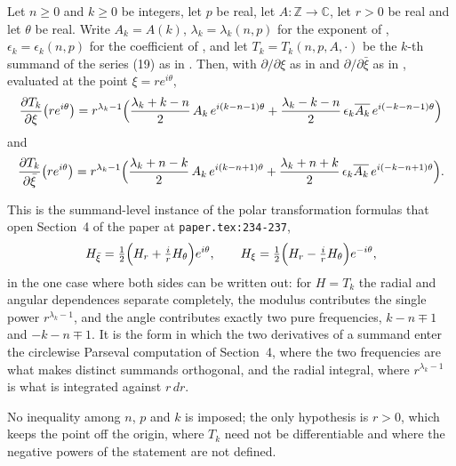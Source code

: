 \begin{helper}
Let $n\ge0$ and $k\ge0$ be integers, let $p$ be real, let
$A\colon\mathbb{Z}\to\mathbb{C}$, let $r>0$ be real and let $\theta$ be real.
Write $A_k=A(k)$, $\lambda_k=\lambda_k(n,p)$ for the exponent of
, $\epsilon_k=\epsilon_k(n,p)$ for the coefficient of
, and let $T_k=T_k(n,p,A,\cdot)$ be the $k$-th summand of the
series (19) as in .  Then, with $\partial/\partial\xi$ as in
 and $\partial/\partial\bar\xi$ as in , evaluated at
the point $\xi=re^{i\theta}$,
\[
  \frac{\partial T_k}{\partial\xi}\bigl(re^{i\theta}\bigr)
  =r^{\lambda_k-1}\Bigl(
      \frac{\lambda_k+k-n}{2}\,A_k\,e^{i(k-n-1)\theta}
     +\frac{\lambda_k-k-n}{2}\,\epsilon_k\overline{A_k}\,
        e^{i(-k-n-1)\theta}\Bigr)
\]
and
\[
  \frac{\partial T_k}{\partial\bar\xi}\bigl(re^{i\theta}\bigr)
  =r^{\lambda_k-1}\Bigl(
      \frac{\lambda_k+n-k}{2}\,A_k\,e^{i(k-n+1)\theta}
     +\frac{\lambda_k+n+k}{2}\,\epsilon_k\overline{A_k}\,
        e^{i(-k-n+1)\theta}\Bigr).
\]

This is the summand-level instance of the polar transformation formulas that
open Section~4 of the paper at \texttt{paper.tex:234-237},
\[
  H_{\bar\xi}=\tfrac12\Bigl(H_r+\tfrac irH_\theta\Bigr)e^{i\theta},\qquad
  H_\xi=\tfrac12\Bigl(H_r-\tfrac irH_\theta\Bigr)e^{-i\theta},
\]
in the one case where both sides can be written out: for $H=T_k$ the radial and
angular dependences separate completely, the modulus contributes the single
power $r^{\lambda_k-1}$, and the angle contributes exactly two pure
frequencies, $k-n\mp1$ and $-k-n\mp1$.  It is the form in which the two
derivatives of a summand enter the circlewise Parseval computation of
Section~4, where the two frequencies are what makes distinct summands
orthogonal, and the radial integral, where $r^{\lambda_k-1}$ is what is
integrated against $r\,dr$.

No inequality among $n$, $p$ and $k$ is imposed; the only hypothesis is $r>0$,
which keeps the point off the origin, where $T_k$ need not be differentiable
and where the negative powers of the statement are not defined.
\end{helper}

